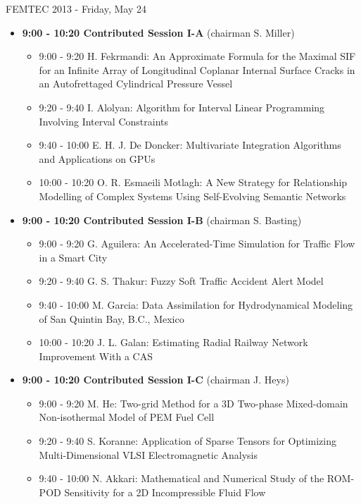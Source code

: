 \documentclass[10pt]{article}%
\begin{document}
\centerline{\huge FEMTEC 2013 - Friday, May 24}
\vspace{4mm}
\begin{itemize}    
\item {\bf 9:00 - 10:20 Contributed Session I-A} (chairman S. Miller) 
  \begin{itemize}
    \item 9:00 - 9:20 {H. Fekrmandi}: {An Approximate Formula for the Maximal SIF for an Infinite Array of Longitudinal Coplanar Internal Surface Cracks in an Autofrettaged Cylindrical Pressure Vessel} %
    \item 9:20 - 9:40 {I. Alolyan}: {Algorithm for Interval Linear  Programming Involving Interval Constraints} %
    \item 9:40 - 10:00 {E. H. J. De Doncker}: {Multivariate Integration Algorithms and Applications on GPUs} %
    \item 10:00 - 10:20 {O. R. Esmaeili Motlagh}: {A New Strategy for Relationship Modelling of Complex Systems Using Self-Evolving Semantic Networks}
  \end{itemize}
  \item {\bf 9:00 - 10:20 Contributed Session I-B} (chairman S. Basting) 
  \begin{itemize}
    \item 9:00 - 9:20 {G. Aguilera}: {An Accelerated-Time Simulation for Traffic Flow in a Smart City} %
    \item 9:20 - 9:40 {G. S. Thakur}: {Fuzzy Soft Traffic Accident Alert Model}
    \item 9:40 - 10:00 {M. Garcia}: {Data Assimilation for Hydrodynamical Modeling of San Quintin Bay, B.C., Mexico}
    \item 10:00 - 10:20 {J. L. Galan}: {Estimating Radial Railway Network Improvement With a CAS} %
  \end{itemize}
    \item {\bf 9:00 - 10:20 Contributed Session I-C} (chairman J. Heys) 
  \begin{itemize}
    \item 9:00 - 9:20 {M. He}: {Two-grid Method for a 3D Two-phase Mixed-domain Non-isothermal Model of PEM Fuel Cell}
    \item 9:20 - 9:40 {S. Koranne}: {Application of Sparse Tensors for Optimizing Multi-Dimensional VLSI Electromagnetic Analysis}
    \item 9:40 - 10:00 {N. Akkari}: {Mathematical and Numerical Study of the ROM-POD Sensitivity for a 2D Incompressible Fluid Flow}

\end{itemize}
\end{itemize}
\end{document}
